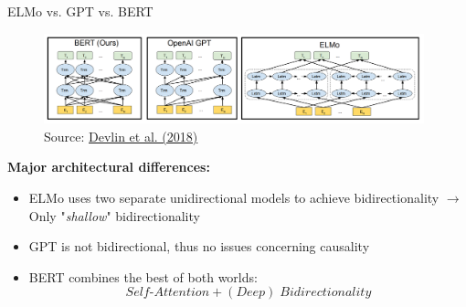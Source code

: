 
\begin{vbframe}{ELMo vs. GPT vs. BERT}

\vfill

\begin{figure}
\centering
\includegraphics[width = 11cm]{figure/comparison-bert.png}\\ 
\footnotesize{Source:} \href{https://arxiv.org/pdf/1810.04805.pdf}{Devlin et al. (2018)}
\end{figure}

\textbf{Major architectural differences:}

\begin{itemize}
\item ELMo uses two separate unidirectional models to achieve bidirectionality 
  $\rightarrow$ Only "\textit{shallow}" bidirectionality
\item GPT is not bidirectional, thus no issues concerning causality
\item BERT combines the best of both worlds: $$Self\text{-}Attention + (Deep)\;Bidirectionality$$
\end{itemize} 

\vfill

\end{vbframe}


